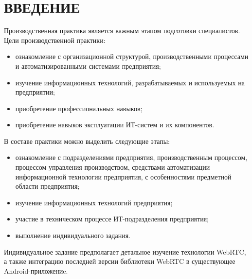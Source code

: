 \section*{ВВЕДЕНИЕ}

Производственная практика является важным этапом подготовки специалистов.
Цели производственной практики:
\begin{itemize}
\item ознакомление с организационной структурой, производственными процессами и
  автоматизированными системами предприятия;
\item изучение информационных технологий, разрабатываемых и используемых на предприятии;
\item приобретение профессиональных навыков;
\item приобретение навыков эксплуатации ИТ-систем и их компонентов.
\end{itemize}

В составе практики можно выделить следующие этапы:
\begin{itemize}
\item ознакомление с подразделениями предприятия, производственным процессом, 
  процессом управления производством, средствами автоматизации информационной технологии предприятия, 
  с особенностями предметной области предприятия;
\item изучение информационных технологий предприятия;
\item участие в техническом процессе ИТ-подразделения предприятия;
\item выполнение индивидуального задания.
\end{itemize}

Индивидуальное задание предполагает детальное изучение технологии WebRTC,
а также интеграцию последней версии библиотеки WebRTC в существующее Android-приложениe.